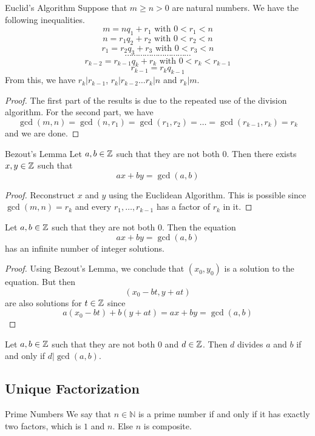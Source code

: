 \documentclass[a4paper]{article}
\begin{document}
\begin{thm}{Euclid's Algorithm}{} Suppose that $m\geq n>0$ are natural numbers. We have the following inequalities. 
$$m=nq_1+r_1\text{ with }0<r_1<n$$
$$n=r_1q_2+r_2\text{ with }0<r_2<n$$
$$r_1=r_2q_3+r_3\text{ with }0<r_3<n$$
$$\cdots\cdots\cdots\cdots\cdots\cdots\cdots\cdots\cdots\cdots$$
$$r_{k-2}=r_{k-1}q_k+r_k\text{ with }0<r_k<r_{k-1}$$
$$r_{k-1}=r_kq_{k-1}$$
From this, we have $r_k|r_{k-1}$, $r_k|r_{k-2}\dots r_k|n$ and $r_k|m$. 
\begin{proof} The first part of the results is due to the repeated use of the division algorithm. For the second part, we have $$\gcd(m,n)=\gcd(n,r_1)=\gcd(r_1,r_2)=\dots=\gcd(r_{k-1},r_k)=r_k$$ and we are done. 
\end{proof}
\end{thm}

\begin{lmm}{Bezout's Lemma}{} Let $a,b\in\mathbb{Z}$ such that they are not both $0$. Then there exists $x,y\in\mathbb{Z}$ such that $$ax+by=\gcd(a,b)$$ 
\begin{proof} Reconstruct $x$ and $y$ using the Euclidean Algorithm. This is possible since $\gcd(m,n)=r_k$ and every $r_1,\dots,r_{k-1}$ has a factor of $r_k$ in it. 
\end{proof}
\end{lmm}

\begin{lmm}{}{} Let $a,b\in\mathbb{Z}$ such that they are not both $0$. Then the equation $$ax+by=\gcd(a,b)$$ has an infinite number of integer solutions. 
\begin{proof} Using Bezout's Lemma, we conclude that $(x_0,y_0)$ is a solution to the equation. But then $$(x_0-bt,y+at)$$ are also solutions for $t\in\mathbb{Z}$ since $$a(x_0-bt)+b(y+at)=ax+by=\gcd(a,b)$$
\end{proof}
\end{lmm}

\begin{crl}{}{} Let $a,b\in\mathbb{Z}$ such that they are not both $0$ and $d\in\mathbb{Z}$. Then $d$ divides $a$ and $b$ if and only if $d|\gcd(a,b)$. 
\end{crl}

\subsection{Unique Factorization}
\begin{defn}{Prime Numbers}{} We say that $n\in\mathbb{N}$ is a prime number if and only if it has exactly two factors, which is $1$ and $n$. Else $n$ is composite. 
\end{defn}
\end{document}
